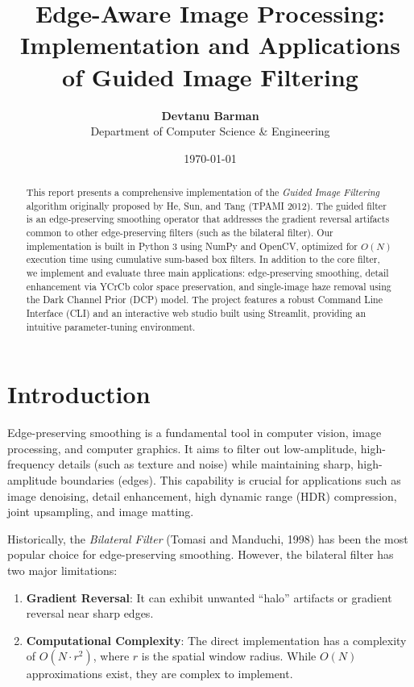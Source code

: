 \documentclass[11pt,a4paper]{article}
\title{\textbf{Edge-Aware Image Processing: Implementation and Applications of Guided Image Filtering}}
\author{\textbf{Devtanu Barman} \\ Department of Computer Science \& Engineering}
\date{\today}
\begin{document}
\maketitle

\begin{abstract}
This report presents a comprehensive implementation of the \textit{Guided Image Filtering} algorithm originally proposed by He, Sun, and Tang (TPAMI 2012). The guided filter is an edge-preserving smoothing operator that addresses the gradient reversal artifacts common to other edge-preserving filters (such as the bilateral filter). Our implementation is built in Python 3 using NumPy and OpenCV, optimized for $O(N)$ execution time using cumulative sum-based box filters. In addition to the core filter, we implement and evaluate three main applications: edge-preserving smoothing, detail enhancement via YCrCb color space preservation, and single-image haze removal using the Dark Channel Prior (DCP) model. The project features a robust Command Line Interface (CLI) and an interactive web studio built using Streamlit, providing an intuitive parameter-tuning environment.
\end{abstract}

\newpage
\tableofcontents
\newpage

\section{Introduction}
Edge-preserving smoothing is a fundamental tool in computer vision, image processing, and computer graphics. It aims to filter out low-amplitude, high-frequency details (such as texture and noise) while maintaining sharp, high-amplitude boundaries (edges). This capability is crucial for applications such as image denoising, detail enhancement, high dynamic range (HDR) compression, joint upsampling, and image matting.

Historically, the \textit{Bilateral Filter} (Tomasi and Manduchi, 1998) has been the most popular choice for edge-preserving smoothing. However, the bilateral filter has two major limitations:
\begin{enumerate}
    \item \textbf{Gradient Reversal}: It can exhibit unwanted ``halo'' artifacts or gradient reversal near sharp edges.
    \item \textbf{Computational Complexity}: The direct implementation has a complexity of $O(N \cdot r^2)$, where $r$ is the spatial window radius. While $O(N)$ approximations exist, they are complex to implement.
\end{enumerate}
\end{document}
